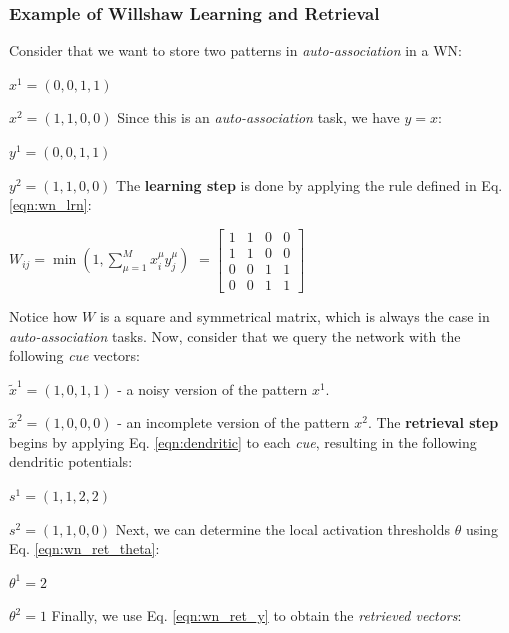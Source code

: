 \documentclass[runningheads]{llncs}
\begin{document}
\subsubsection{Example of Willshaw Learning and Retrieval}
\label{sec:wn_example}

Consider that we want to store two patterns in \textit{auto-association} in a WN:

$x^{1} = (0,0,1,1)$

$x^{2} = (1,1,0,0)$
\newline
Since this is an \textit{auto-association} task, we have $y=x$:

$y^{1} = (0,0,1,1)$

$y^{2} = (1,1,0,0)$
\newline
\newline
The \textbf{learning step} is done by applying the rule defined in Eq. \ref{eqn:wn_lrn}:
\newline

$W_{i j}=\min \left(1, \sum_{\mu=1}^{M} x_{i}^{\mu} y_{j}^{\mu}\right)$
$=\left[\begin{array}{llll}
1 & 1 & 0 & 0 \\
1 & 1 & 0 & 0 \\
0 & 0 & 1 & 1 \\
0 & 0 & 1 & 1 
\end{array}\right]$
\newline

Notice how $W$ is a square and symmetrical matrix, which is always the case in \textit{auto-association} tasks.
\newline
\newline
Now, consider that we query the network with the following \textit{cue} vectors:

$\tilde{x}^{1} = (1,0,1,1)$ - a noisy version of the pattern $x^{1}$. 

$\tilde{x}^{2} = (1,0,0,0)$ - an incomplete version of  the pattern $x^{2}$.
\newline
\newline
The \textbf{retrieval step} begins by applying Eq. \ref{eqn:dendritic} to each \textit{cue}, resulting in the following dendritic potentials:

$s^1=(1,1,2,2)$

$s^2=(1,1,0,0)$
\newline
Next, we can determine the local activation thresholds $\theta$ using Eq. \ref{eqn:wn_ret_theta}:

$\theta^1=2$

$\theta^2=1$
\newline
Finally, we use Eq. \ref{eqn:wn_ret_y} to obtain the \textit{retrieved vectors}:
\end{document}
